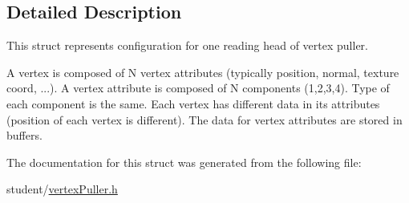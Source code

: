 \subsection{Detailed Description}
This struct represents configuration for one reading head of vertex puller. 

A vertex is composed of N vertex attributes (typically position, normal, texture coord, ...). A vertex attribute is composed of N components (1,2,3,4). Type of each component is the same. Each vertex has different data in its attributes (position of each vertex is different). The data for vertex attributes are stored in buffers. 

The documentation for this struct was generated from the following file\+:\begin{DoxyCompactItemize}
\item 
student/\hyperlink{vertexPuller_8h}{vertex\+Puller.\+h}\end{DoxyCompactItemize}
